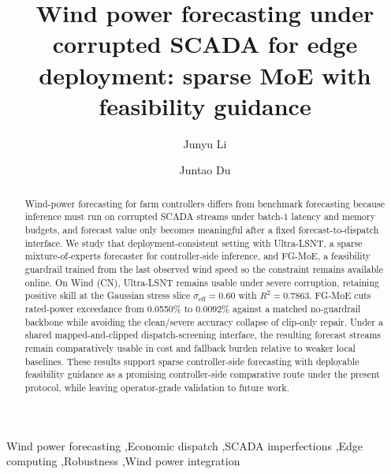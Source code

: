 ﻿\documentclass[review,1p,times]{elsarticle}
\newif\ifincludefrontmatterextras
\newenvironment{highlights}{\par\noindent\textbf{Highlights}\par\begin{itemize}\itemsep0pt}{\end{itemize}\par}%
\begin{document}
\begin{frontmatter}

\title{Wind power forecasting under corrupted SCADA for edge deployment: sparse MoE with feasibility guidance}

\author[1]{Junyu Li}

\author[1]{Juntao Du}



\ifincludefrontmatterextras
\begin{highlights}
\item Real deployment couples corrupted SCADA, edge budget, and feasibility.
\item Clean benchmark ranking does not reliably transfer to corrupted operation.
\item Sparse routing reallocates computation under corrupted SCADA telemetry.
\item FG-MoE improves feasibility without clip-only accuracy collapse.
\item Dispatch gains are reported under a shared screening interface.
\end{highlights}
\fi

\begin{abstract}
Wind-power forecasting for farm controllers differs from benchmark forecasting because inference must run on corrupted SCADA streams under batch-$1$ latency and memory budgets, and forecast value only becomes meaningful after a fixed forecast-to-dispatch interface. We study that deployment-consistent setting with Ultra-LSNT, a sparse mixture-of-experts forecaster for controller-side inference, and FG-MoE, a feasibility guardrail trained from the last observed wind speed so the constraint remains available online. On Wind (CN), Ultra-LSNT remains usable under severe corruption, retaining positive skill at the Gaussian stress slice $\sigma_{\mathrm{eff}}=0.60$ with $R^2=0.7863$. FG-MoE cuts rated-power exceedance from 0.0550\% to 0.0092\% against a matched no-guardrail backbone while avoiding the clean/severe accuracy collapse of clip-only repair. Under a shared mapped-and-clipped dispatch-screening interface, the resulting forecast streams remain comparatively usable in cost and fallback burden relative to weaker local baselines. These results support sparse controller-side forecasting with deployable feasibility guidance as a promising controller-side comparative route under the present protocol, while leaving operator-grade validation to future work.
\end{abstract}





\begin{keyword}
Wind power forecasting \sep Economic dispatch \sep SCADA imperfections \sep Edge computing \sep Robustness \sep Wind power integration
\end{keyword}

\end{frontmatter}
\end{document}
